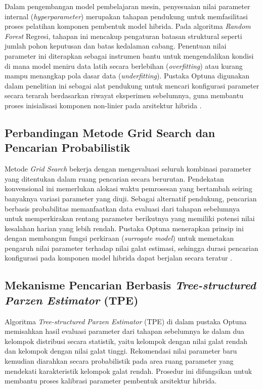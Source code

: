 Dalam pengembangan model pembelajaran mesin, penyesuaian nilai parameter internal (\textit{hyperparameter}) merupakan tahapan pendukung untuk memfasilitasi proses pelatihan komponen pembentuk model hibrida. Pada algoritma \textit{Random Forest} Regresi, tahapan ini mencakup pengaturan batasan struktural seperti jumlah pohon keputusan dan batas kedalaman cabang. Penentuan nilai parameter ini diterapkan sebagai instrumen bantu untuk mengendalikan kondisi di mana model meniru data latih secara berlebihan (\textit{overfitting}) atau kurang mampu menangkap pola dasar data (\textit{underfitting}). Pustaka Optuna digunakan dalam penelitian ini sebagai alat pendukung untuk mencari konfigurasi parameter secara terarah berdasarkan riwayat eksperimen sebelumnya, guna membantu proses inisialisasi komponen non-linier pada arsitektur hibrida \autocite{kostadinov2024forecasting}.

\subsection{Perbandingan Metode Grid Search dan Pencarian Probabilistik}

Metode \textit{Grid Search} bekerja dengan mengevaluasi seluruh kombinasi parameter yang ditentukan dalam ruang pencarian secara berurutan. Pendekatan konvensional ini memerlukan alokasi waktu pemrosesan yang bertambah seiring banyaknya variasi parameter yang diuji. Sebagai alternatif pendukung, pencarian berbasis probabilitas memanfaatkan data evaluasi dari tahapan sebelumnya untuk memperkirakan rentang parameter berikutnya yang memiliki potensi nilai kesalahan harian yang lebih rendah. Pustaka Optuna menerapkan prinsip ini dengan membangun fungsi perkiraan (\textit{surrogate model}) untuk memetakan pengaruh nilai parameter terhadap nilai galat estimasi, sehingga durasi pencarian konfigurasi pada komponen model hibrida dapat berjalan secara teratur \autocite{kostadinov2024forecasting}.

\subsection{Mekanisme Pencarian Berbasis \textit{Tree-structured Parzen Estimator} (TPE)}

Algoritma \textit{Tree-structured Parzen Estimator} (TPE) di dalam pustaka Optuna memisahkan hasil evaluasi parameter dari tahapan sebelumnya ke dalam dua kelompok distribusi secara statistik, yaitu kelompok dengan nilai galat rendah dan kelompok dengan nilai galat tinggi. Rekomendasi nilai parameter baru kemudian diarahkan secara probabilistik pada area ruang parameter yang mendekati karakteristik kelompok galat rendah. Prosedur ini difungsikan untuk membantu proses kalibrasi parameter pembentuk arsitektur hibrida.

